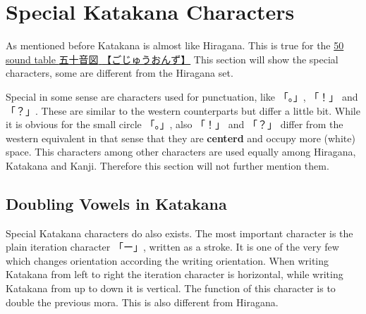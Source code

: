 \section{Special Katakana Characters}

As mentioned before Katakana is almost like Hiragana. This is true for the
\hyperref[sec:50SoundTable]{50 sound table  {五十音図} {【ごじゅうおんず】}}
This section will show the special characters, some are different from the
Hiragana set.

Special in some sense are characters used for punctuation, like {「。」},
{「！」} and {「？」}.  These are similar to the western counterparts but
differ a little bit. While it is obvious for the small circle {「。」}, also
{「！」} and {「？」} differ from the western equivalent in that sense that
they are \textbf{centerd} and occupy more (white) space. This characters among
other characters are used equally among Hiragana, Katakana and Kanji. Therefore
this section will not further mention them.


\subsection{Doubling Vowels in Katakana}

Special Katakana characters do also exists. The most important character is
the plain iteration character {「ー」}, written as a stroke. It is one of the
very few which changes orientation according the writing orientation. When
writing Katakana from left to right the iteration character is horizontal,
while writing Katakana from up to down it is vertical. The function of
this character is to double the previous mora. This is also different
from Hiragana.

\bigskip


\bigskip


\bigskip



